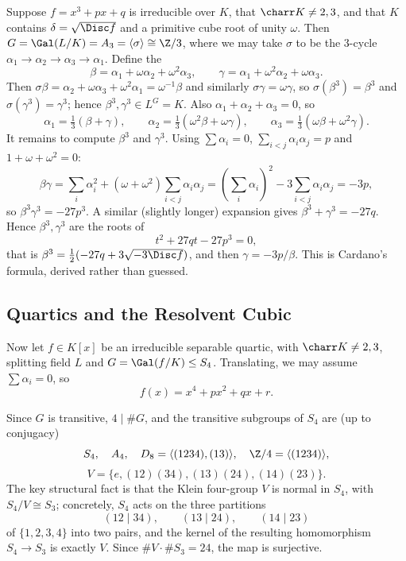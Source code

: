\begin{example}\label{ex:cubicresolvent}
	Suppose $f = x^3+px+q$ is irreducible over $K$, that $\charr K \neq 2,3$, and that $K$ contains $\delta = \sqrt{\Disc f}$ and a primitive cube root of unity $\omega$. Then $G = \Gal(L/K) = A_3 = \langle\sigma\rangle \cong \Z/3$, where we may take $\sigma$ to be the $3$-cycle $\alpha_1 \to \alpha_2 \to \alpha_3 \to \alpha_1$. Define the 
	$$\beta = \alpha_1 + \omega\alpha_2+\omega^2\alpha_3, \qquad \gamma = \alpha_1+\omega^2\alpha_2+\omega\alpha_3.$$
	Then $\sigma\beta = \alpha_2 + \omega\alpha_3 + \omega^2\alpha_1 = \omega^{-1}\beta$ and similarly $\sigma\gamma = \omega\gamma$, so $\sigma(\beta^3) = \beta^3$ and $\sigma(\gamma^3) = \gamma^3$; hence $\beta^3, \gamma^3 \in L^G = K$. Also $\alpha_1+\alpha_2+\alpha_3 = 0$, so
	$$\alpha_1 = \tfrac13(\beta+\gamma), \qquad \alpha_2 = \tfrac13(\omega^2\beta+\omega\gamma), \qquad \alpha_3 = \tfrac13(\omega\beta+\omega^2\gamma).$$
	It remains to compute $\beta^3$ and $\gamma^3$. Using $\sum\alpha_i = 0$, $\sum_{i<j}\alpha_i\alpha_j = p$ and $1 + \omega + \omega^2 = 0$:
	$$\beta\gamma = \sum_i \alpha_i^2 + (\omega+\omega^2)\sum_{i<j}\alpha_i\alpha_j = \left(\sum_i\alpha_i\right)^2 - 3\sum_{i<j}\alpha_i\alpha_j = -3p,$$
	so $\beta^3\gamma^3 = -27p^3$. A similar (slightly longer) expansion gives $\beta^3 + \gamma^3 = -27q$. Hence $\beta^3, \gamma^3$ are the roots of
	$$t^2 + 27qt - 27p^3 = 0,$$
	that is $\beta^3 = \tfrac12(-27q + 3\sqrt{-3\Disc f})$, and then $\gamma = -3p/\beta$. This is Cardano's formula, derived rather than guessed.
\end{example}

\subsection{Quartics and the Resolvent Cubic}

Now let $f \in K[x]$ be an irreducible separable quartic, with $\charr K \neq 2,3$, splitting field $L$ and $G = \Gal(f/K) \leq S_4$. Translating, we may assume $\sum\alpha_i = 0$, so
$$f(x) = x^4 + px^2 + qx + r.$$

Since $G$ is transitive, $4 \mid \#G$, and the transitive subgroups of $S_4$ are (up to conjugacy)
$$S_4, \quad A_4, \quad D_8 = \langle (1234), (13)\rangle, \quad \Z/4 = \langle(1234)\rangle,$$
$$V = \{e,(12)(34),(13)(24),(14)(23)\}.$$
The key structural fact is that the Klein four-group $V$ is normal in $S_4$, with $S_4/V \cong S_3$; concretely, $S_4$ acts on the three partitions
$$(12\mid34), \qquad (13\mid24), \qquad (14\mid23)$$
of $\{1,2,3,4\}$ into two pairs, and the kernel of the resulting homomorphism $S_4 \to S_3$ is exactly $V$. Since $\#V \cdot \#S_3 = 24$, the map is surjective.

